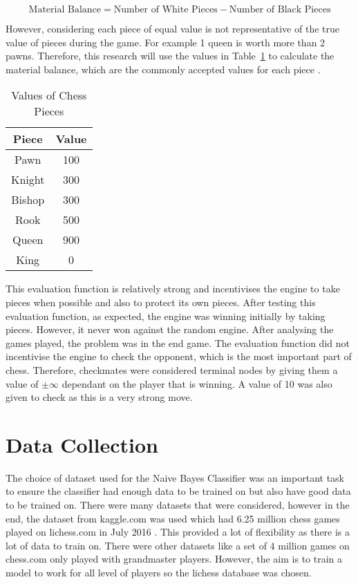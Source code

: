 \begin{equation}
    \label{eq:material_1}
    \text{Material Balance} = \text{Number of White Pieces} - \text{Number of Black Pieces} 
\end{equation}


However, considering each piece of equal value is not representative of the true value of pieces during the game. For example 1 queen is worth more than 2 pawns. Therefore, this research will use the values in Table~\ref{tab:values} to calculate the material balance, which are the commonly accepted values for each piece \cite{guptaDeterminingChessPiece2023}.

\begin{table}[h]
    \centering
    \begin{tabular}{|c|c|}
        \hline
        \textbf{Piece} & \textbf{Value} \\
        \hline
        Pawn & 100 \\
        Knight & 300 \\
        Bishop & 300 \\
        Rook & 500 \\
        Queen & 900 \\
        King & 0 \\
        \hline
    \end{tabular}
    \caption{Values of Chess Pieces}
    \label{tab:values}
\end{table}

This evaluation function is relatively strong and incentivises the engine to take pieces when possible and also to protect its own pieces. After testing this evaluation function, as expected, the engine was winning initially by taking pieces. However, it never won against the random engine. After analysing the games played, the problem was in the end game. The evaluation function did not incentivise the engine to check the opponent, which is the most important part of chess. Therefore, checkmates were considered terminal nodes by giving them a value of $\pm \infty$ dependant on the player that is winning. A value of 10 was also given to check as this is a very strong move. 


\section{Data Collection}

The choice of dataset used for the Naive Bayes Classifier was an important task to ensure the classifier had enough data to be trained on but also have good data to be trained on. There were many datasets that were considered, however in the end, the dataset from kaggle.com was used 
which had 6.25 million chess games played on lichess.com in July 2016 . This provided a lot of flexibility as there is a lot of data to train on. There were other datasets like a set of 4 million games on chess.com only played with grandmaster players. However, the aim is to train a model to work for all level of players so the lichess database was chosen. 

